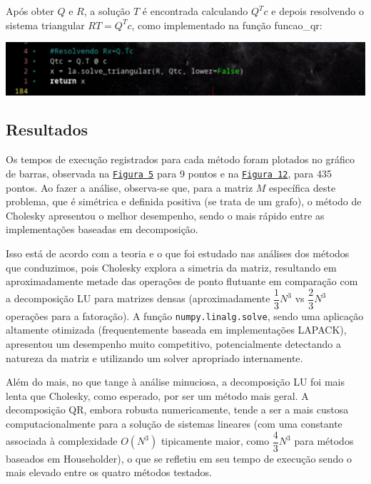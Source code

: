 \documentclass{article}
\begin{document}
    Após obter $Q$ e $R$, a solução $T$ é encontrada calculando $Q^T c$ e depois resolvendo o sistema triangular $RT = Q^T c$, como implementado na função funcao\_qr:

    \begin{center}
    \includegraphics[width=0.8\linewidth]{imgs/qr_2.png}
    \end{center}

    \hypertarget{1}{}
    \hypertarget{5}{}

    \subsection{Resultados}

    Os tempos de execução registrados para cada método foram plotados no gráfico de barras, observada na \hyperlink{2}{\texttt{Figura 5}} para 9 pontos e na \hyperlink{6}{\texttt{Figura 12}}, para 435 pontos. Ao fazer a análise, observa-se que, para a matriz $M$ específica deste problema, que é simétrica e definida positiva (se trata de um grafo), o método de Cholesky apresentou o melhor desempenho, sendo o mais rápido entre as implementações baseadas em decomposição.

    Isso está de acordo com a teoria e o que foi estudado nas análises dos métodos que conduzimos, pois Cholesky explora a simetria da matriz, resultando em aproximadamente metade das operações de ponto flutuante em comparação com a decomposição LU para matrizes densas (aproximadamente $\dfrac{1}{3}N^3$ vs $\dfrac{2}{3}N^3$ operações para a fatoração). A função \texttt{numpy.linalg.solve}, sendo uma aplicação altamente otimizada (frequentemente baseada em implementações LAPACK), apresentou um desempenho muito competitivo, potencialmente detectando a natureza da matriz e utilizando um solver apropriado internamente.

    Além do mais, no que tange à análise minuciosa, a decomposição LU foi mais lenta que Cholesky, como esperado, por ser um método mais geral. A decomposição QR, embora robusta numericamente, tende a ser a mais custosa computacionalmente para a solução de sistemas lineares (com uma constante associada à complexidade $O(N^3)$ tipicamente maior, como $\dfrac{4}{3}N^3$ para métodos baseados em Householder), o que se refletiu em seu tempo de execução sendo o mais elevado entre os quatro métodos testados.
\end{document}
